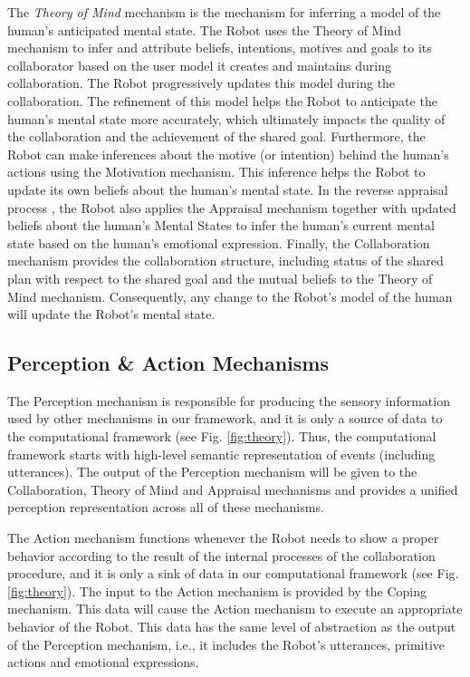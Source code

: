 The \textit{Theory of Mind} mechanism is the mechanism for inferring a model of
the human's anticipated mental state. The Robot uses the Theory of Mind
mechanism to infer and attribute beliefs, intentions, motives and goals to its
collaborator based on the user model it creates and maintains during
collaboration. The Robot progressively updates this model during the
collaboration. The refinement of this model helps the Robot to anticipate the
human's mental state more accurately, which ultimately impacts the quality of
the collaboration and the achievement of the shared goal. Furthermore, the Robot
can make inferences about the motive (or intention) behind the human's actions
using the Motivation mechanism. This inference helps the Robot to update its own
beliefs about the human's mental state. In the reverse appraisal process
\cite{gratch:reverse-appraisal}, the Robot also applies the Appraisal mechanism
together with updated beliefs about the human's Mental States to infer the
human's current mental state based on the human's emotional expression. Finally,
the Collaboration mechanism provides the collaboration structure, including
status of the shared plan with respect to the shared goal and the mutual beliefs
to the Theory of Mind mechanism. Consequently, any change to the Robot's model
of the human will update the Robot's mental state.

\subsection{Perception \& Action Mechanisms}
\label{sec:tom-mech}

The Perception mechanism is responsible for producing the sensory information
used by other mechanisms in our framework, and it is only a source of data to
the computational framework (see Fig. \ref{fig:theory}). Thus, the computational
framework starts with high-level semantic representation of events (including
utterances). The output of the Perception mechanism will be given to the
Collaboration, Theory of Mind and Appraisal mechanisms and provides a unified
perception representation across all of these mechanisms.

The Action mechanism functions whenever the Robot needs to show a proper
behavior according to the result of the internal processes of the collaboration
procedure, and it is only a sink of data in our computational framework (see
Fig. \ref{fig:theory}). The input to the Action mechanism is provided by the
Coping mechanism. This data will cause the Action mechanism to execute an
appropriate behavior of the Robot. This data has the same level of abstraction
as the output of the Perception mechanism, i.e., it includes the Robot's
utterances, primitive actions and emotional expressions.

